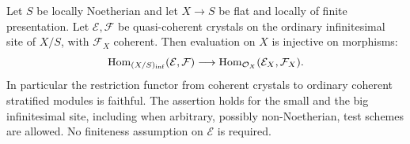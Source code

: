 \begin{proposition}\label{prop:DE-E2-coherent-faithfulness}
Let $S$ be locally Noetherian and let $X\to S$ be flat and locally of finite presentation.  Let $\mathcal E,\mathcal F$ be quasi-coherent crystals on the ordinary infinitesimal site of $X/S$, with $\mathcal F_X$ coherent.  Then evaluation on $X$ is injective on morphisms:
\[
 \operatorname{Hom}_{(X/S)_{\rm inf}}(\mathcal E,\mathcal F)
       \longrightarrow \operatorname{Hom}_{\mathcal O_X}(\mathcal E_X,\mathcal F_X).
\]
In particular the restriction functor from coherent crystals to ordinary coherent stratified modules is faithful.  The assertion holds for the small and the big infinitesimal site, including when arbitrary, possibly non-Noetherian, test schemes are allowed.  No finiteness assumption on $\mathcal E$ is required.
\end{proposition}
